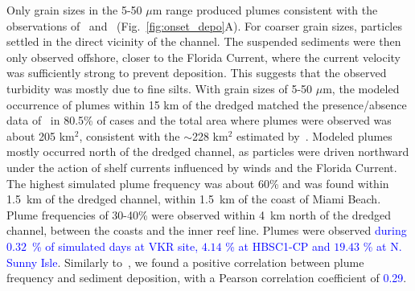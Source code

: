 \documentclass[preprint,12pt,authoryear]{elsarticle}
\newcommand{\modif}[1]{\textcolor{blue}{#1}}
\begin{document}
Only grain sizes in the 5-50 $\mu$m range produced plumes consistent with the observations of~\cite{barnes2015sediment} and~\cite{cunning2019extensive} (Fig.~\ref{fig:onset_depo}A). For coarser grain sizes, particles settled in the direct vicinity of the channel. The suspended sediments were then only observed offshore, closer to the Florida Current, where the current velocity was sufficiently strong to prevent deposition. This suggests that the observed turbidity was mostly due to fine silts. With grain sizes of 5-50 $\mu$m, the modeled occurrence of plumes  within 15 km of the dredged matched the presence/absence data of~\cite{cunning2019extensive} in 80.5\% of cases and the total area where plumes were observed was about 205 km$^2$, consistent with the $\sim$228 km$^2$ estimated by~\cite{barnes2015sediment}. Modeled plumes mostly occurred north of the dredged channel, as particles were driven northward under the action of shelf currents influenced by winds and the Florida Current. The highest simulated plume frequency was about 60\% and was found within 1.5~km of the dredged channel, within 1.5~km of the coast of Miami Beach. Plume frequencies of 30-40\% were observed within 4~km north of the dredged channel, between the coasts and the inner reef line. Plumes were observed \modif{during $0.32$~\% of simulated days at VKR site, $4.14$ \% at HBSC1-CP and $19.43$ \% at N. Sunny Isle}. Similarly to~\cite{cunning2019extensive}, we found a positive correlation between plume frequency and sediment deposition, with a Pearson correlation coefficient of \modif{0.29}.

\end{document}

